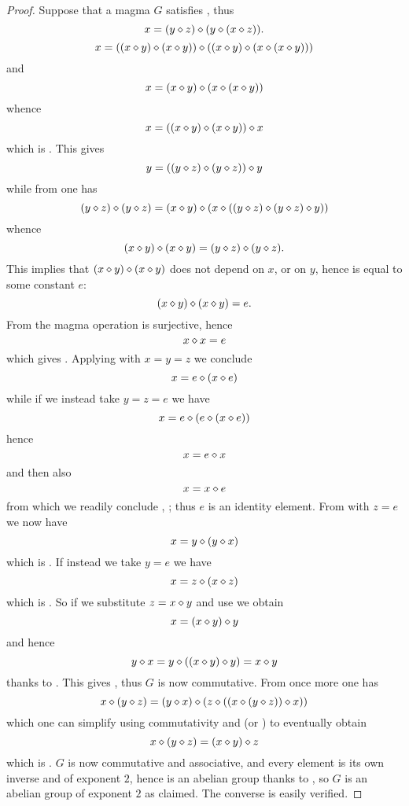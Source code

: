 \begin{proof}\leanok  Suppose that a magma $G$ satisfies , thus
\begin{equation}\label{1571-again}
 x = (y \diamond z) \diamond (y \diamond (x \diamond z)).
\end{equation}
$$ x = ((x \diamond y) \diamond (x \diamond y)) \diamond ((x \diamond y) \diamond (x \diamond (x \diamond y)))$$
and
$$ x = (x \diamond y) \diamond (x \diamond (x \diamond y))$$
whence
$$x = ((x \diamond y) \diamond (x \diamond y)) \diamond x$$
which is .  This gives
$$y = ((y \diamond z) \diamond (y \diamond z)) \diamond y$$
while from  one has
$$ (y \diamond z) \diamond (y \diamond z) = (x \diamond y) \diamond (x \diamond ((y \diamond z) \diamond (y \diamond z) \diamond y))$$
whence
$$ (x \diamond y) \diamond (x \diamond y) = (y \diamond z) \diamond (y \diamond z).$$
This implies that $(x \diamond y) \diamond (x \diamond y)$ does not depend on $x$, or on $y$, hence is equal to some constant $e$:
$$ (x \diamond y) \diamond (x \diamond y) = e.$$
From  the magma operation is surjective, hence
\begin{equation}\label{xxe} x \diamond x = e
\end{equation}
which gives .  Applying  with $x=y=z$ we conclude
$$ x = e \diamond (x \diamond e)$$
while if we instead take $y=z=e$ we have
$$ x = e \diamond (e \diamond (x \diamond e))$$
hence
$$ x = e \diamond x$$
and then also
$$ x = x \diamond e$$
from which we readily conclude , ; thus $e$ is an identity element.  From  with $z=e$ we now have
\begin{equation}\label{16-again}
 x = y \diamond (y \diamond x)
\end{equation}
which is . If instead we take $y=e$ we have
\begin{equation}\label{14-again}
  x = z \diamond (x \diamond z)
\end{equation}
which is .  So if we substitute $z = x \diamond y$ and use  we obtain
$$ x = (x \diamond y) \diamond y$$
and hence
$$ y \diamond x = y \diamond ((x \diamond y) \diamond y) = x \diamond y$$
thanks to .  This gives , thus $G$ is now commutative.  From  once more one has
$$x \diamond (y \diamond z) = (y \diamond x) \diamond (z \diamond ((x \diamond (y \diamond z)) \diamond x))$$
which one can simplify using commutativity and  (or ) to eventually obtain
$$x \diamond (y \diamond z) = (x \diamond y) \diamond z$$
which is .  $G$ is now commutative and associative, and every element is its own inverse and of exponent $2$, hence is an abelian group thanks to , so $G$ is an abelian group of exponent $2$ as claimed.  The converse is easily verified.
\end{proof}

